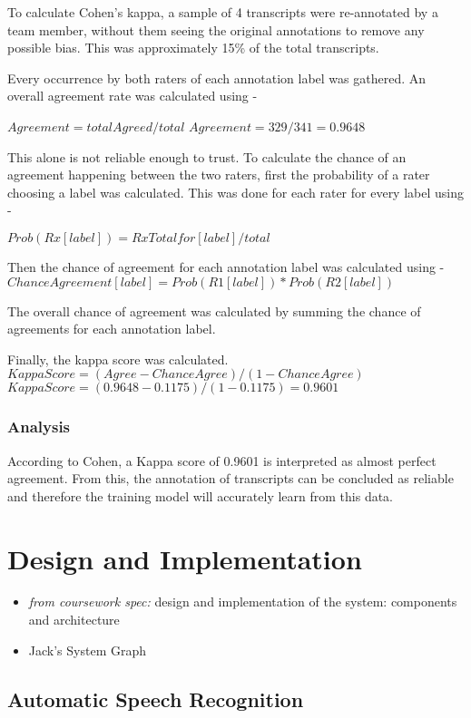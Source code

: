 \documentclass[hidelinks, 11pt]{article}
\begin{document}
To calculate Cohen's kappa, a sample of 4 transcripts were re-annotated by a team member, without them seeing the original annotations to remove any possible bias. This was approximately 15\% of the total transcripts.

Every occurrence by both raters of each annotation label was gathered. An overall agreement rate was calculated using - 

$Agreement = totalAgreed / total$
$Agreement = 329/341 = 0.9648$

This alone is not reliable enough to trust. 
To calculate the chance of an agreement happening between the two raters, first the probability of a rater choosing a label was calculated. This was done for each rater for every label using - 

$Prob(Rx[label]) = Rx Total for [label] / total$

Then the chance of agreement for each annotation label was calculated using - 
$ChanceAgreement[label] = Prob(R1[label]) * Prob(R2[label])$

The overall chance of agreement was calculated by summing the chance of agreements for each annotation label.

Finally, the kappa score was calculated.
$KappaScore = (Agree-ChanceAgree)/(1-ChanceAgree)$
$KappaScore = (0.9648-0.1175)/(1-0.1175) = 0.9601$
\subsubsection{Analysis}
According to Cohen, a Kappa score of 0.9601 is interpreted as almost perfect agreement. From this, the annotation of transcripts can be concluded as reliable and therefore the training model will accurately learn from this data.

\section{Design and Implementation}
\label{sec:implementation}

\begin{itemize}
  \item \textit{from coursework spec:} design and implementation of the system: components and architecture
  \item Jack's System Graph
\end{itemize}

\subsection{Automatic Speech Recognition}
\label{subsec:asr}
\end{document}

